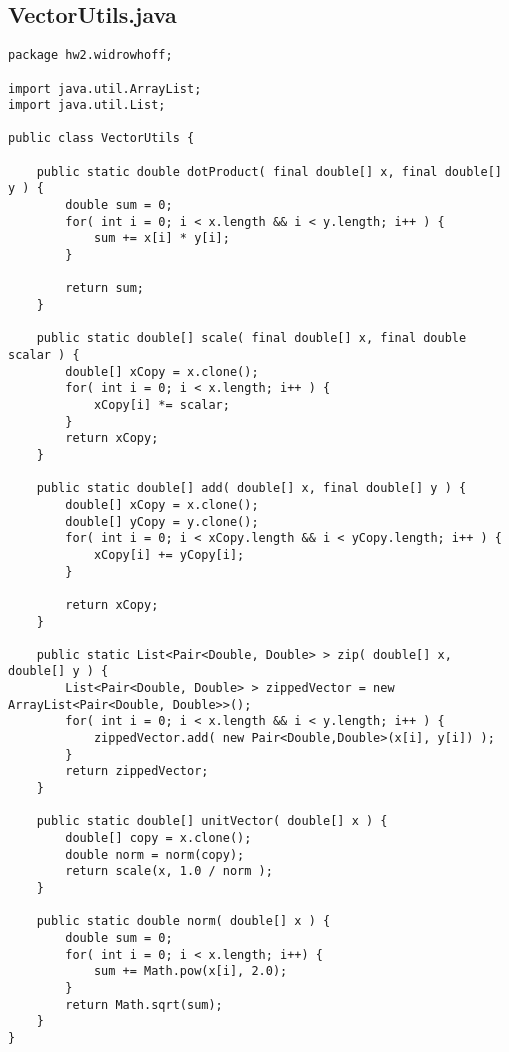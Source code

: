 \subsection{VectorUtils.java}
\begin{lstlisting}
package hw2.widrowhoff;

import java.util.ArrayList;
import java.util.List;

public class VectorUtils {
	
	public static double dotProduct( final double[] x, final double[] y ) {
		double sum = 0;
		for( int i = 0; i < x.length && i < y.length; i++ ) {
			sum += x[i] * y[i];
		}
		
		return sum;
	}
	
	public static double[] scale( final double[] x, final double scalar ) {
		double[] xCopy = x.clone();
		for( int i = 0; i < x.length; i++ ) {
			xCopy[i] *= scalar;
		}
		return xCopy;
	}
	
	public static double[] add( double[] x, final double[] y ) {
		double[] xCopy = x.clone();
		double[] yCopy = y.clone();
		for( int i = 0; i < xCopy.length && i < yCopy.length; i++ ) {
			xCopy[i] += yCopy[i];
		}
		
		return xCopy;
	}
	
	public static List<Pair<Double, Double> > zip( double[] x, double[] y ) {
		List<Pair<Double, Double> > zippedVector = new ArrayList<Pair<Double, Double>>();
		for( int i = 0; i < x.length && i < y.length; i++ ) {
			zippedVector.add( new Pair<Double,Double>(x[i], y[i]) );
		}
		return zippedVector;
	}
	
	public static double[] unitVector( double[] x ) {
		double[] copy = x.clone();
		double norm = norm(copy);
		return scale(x, 1.0 / norm );
	}
	
	public static double norm( double[] x ) {
		double sum = 0;
		for( int i = 0; i < x.length; i++) {
			sum += Math.pow(x[i], 2.0);
		}
		return Math.sqrt(sum);
	}
}
\end{lstlisting}
